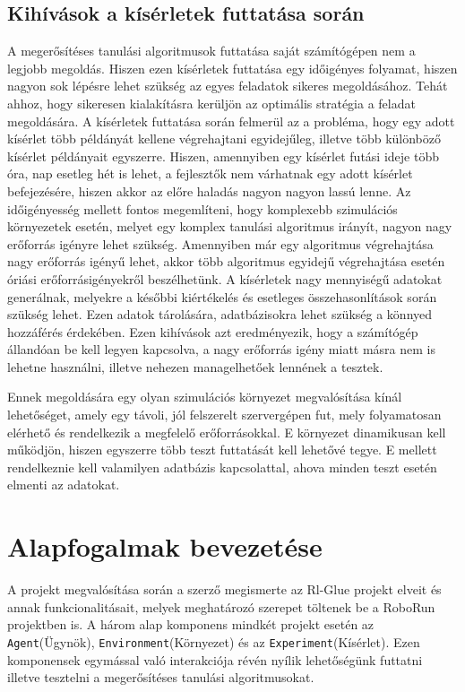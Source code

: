 \subsection{Kihívások a kísérletek futtatása során}
A megerősítéses tanulási algoritmusok futtatása saját számítógépen nem a legjobb megoldás. Hiszen 
ezen kísérletek futtatása egy időigényes folyamat, hiszen nagyon sok lépésre lehet szükség az egyes feladatok sikeres megoldásához. Tehát ahhoz, hogy sikeresen kialakításra kerüljön az optimális stratégia a feladat megoldására. A kísérletek futtatása során felmerül az a probléma, hogy egy adott kísérlet több példányát  kellene végrehajtani egyidejűleg, illetve több különböző kísérlet példányait egyszerre. Hiszen, amennyiben egy kísérlet futási ideje több óra, nap esetleg hét is lehet, a fejlesztők nem várhatnak egy adott kísérlet befejezésére, hiszen akkor az előre haladás nagyon nagyon lassú lenne. Az időigényesség mellett fontos megemlíteni, hogy komplexebb szimulációs környezetek esetén, melyet egy komplex tanulási algoritmus irányít, nagyon nagy erőforrás igényre lehet szükség. Amennyiben már egy algoritmus végrehajtása nagy erőforrás igényű lehet, akkor több algoritmus egyidejű végrehajtása esetén óriási erőforrásigényekről beszélhetünk. A kísérletek nagy mennyiségű adatokat generálnak, melyekre a későbbi kiértékelés és esetleges összehasonlítások során szükség lehet. Ezen adatok tárolására, adatbázisokra lehet szükség a könnyed hozzáférés érdekében. Ezen kihívások azt eredményezik, hogy a számítógép állandóan be kell legyen kapcsolva, a nagy erőforrás igény miatt másra nem is lehetne használni, illetve nehezen managelhetőek lennének a tesztek.  

Ennek megoldására egy olyan szimulációs környezet megvalósítása kínál lehetőséget, amely egy távoli, jól felszerelt szervergépen fut, mely folyamatosan elérhető és rendelkezik a megfelelő erőforrásokkal. E környezet dinamikusan kell működjön, hiszen egyszerre több teszt futtatását kell lehetővé tegye. E mellett rendelkeznie kell valamilyen adatbázis kapcsolattal, ahova minden teszt esetén elmenti az adatokat.

\section{Alapfogalmak bevezetése}\label{sec:ALAPFOGALMAK}

A projekt megvalósítása során a szerző megismerte az  Rl-Glue projekt elveit és annak funkcionalitásait, melyek meghatározó szerepet töltenek be a RoboRun projektben is. A három alap komponens mindkét projekt esetén  az \texttt{Agent}(Ügynök), \texttt{Environment}(Környezet) és az \texttt{Experiment}(Kísérlet). Ezen komponensek egymással való interakciója révén nyílik lehetőségünk futtatni illetve tesztelni a megerősítéses tanulási algoritmusokat. 

